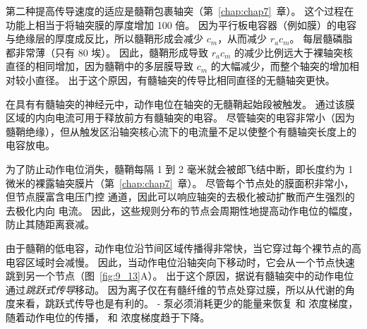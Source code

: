 第二种提高传导速度的适应是髓鞘包裹轴突（第~\ref{chap:chap7}~章）。
这个过程在功能上相当于将轴突膜的厚度增加 100 倍。
因为平行板电容器（例如膜）的电容与绝缘层的厚度成反比，所以髓鞘形成会减少 $c_m$，从而减少 $r_a c_m$。
每层髓磷脂都非常薄（只有 80 埃）。
因此，髓鞘形成导致 $r_a c_m$ 的减少比例远大于裸轴突核直径的相同增加，因为髓鞘中的多层膜导致 $c_m$ 的大幅减少，而整个轴突的增加相对较小直径。
出于这个原因，有髓轴突的传导比相同直径的无髓轴突更快。


在具有有髓轴突的神经元中，动作电位在轴突的无髓鞘起始段被触发。
通过该膜区域的内向电流可用于释放前方有髓轴突的电容。
尽管轴突的电容非常小（因为髓鞘绝缘），但从触发区沿轴突核心流下的电流量不足以使整个有髓轴突长度上的电容放电。


为了防止动作电位消失，髓鞘每隔 1 到 2 毫米就会被郎飞结中断，即长度约为 1 微米的裸露轴突膜片（第~\ref{chap:chap7}~章）。
尽管每个节点处的膜面积非常小，但节点膜富含电压门控  通道，因此可以响应轴突的去极化被动扩散而产生强烈的去极化内向  电流。
因此，这些规则分布的节点会周期性地提高动作电位的幅度，防止其随距离衰减。


由于髓鞘的低电容，动作电位沿节间区域传播得非常快，当它穿过每个裸节点的高电容区域时会减慢。
因此，当动作电位沿轴突向下移动时，它会从一个节点快速跳到另一个节点（图~\ref{fig:9_13}A）。
出于这个原因，据说有髓轴突中的动作电位通过\textit{跳跃式传导}移动。
因为离子仅在有髓纤维的节点处穿过膜，所以从代谢的角度来看，跳跃式传导也是有利的。
- 泵必须消耗更少的能量来恢复  和  浓度梯度，随着动作电位的传播， 和  浓度梯度趋于下降。


